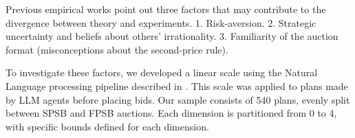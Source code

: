 \documentclass{article} %
\begin{document}


Previous empirical works point out three factors that may contribute to the divergence between theory and experiments.
1. Risk-aversion. 
2. Strategic uncertainty and beliefs about others' irrationality.
3. Familiarity of the auction format (misconceptions about the second-price rule).

To investigate these factors, we developed a linear scale using the Natural Language processing pipeline described in \cite{Horton2024EDSL}. 
This scale was applied to plans made by LLM agents before placing bids. 
Our sample consists of 540 plans, evenly split between SPSB and FPSB auctions. 
Each dimension is partitioned from 0 to 4, with specific bounds defined for each dimension.



\end{document}
